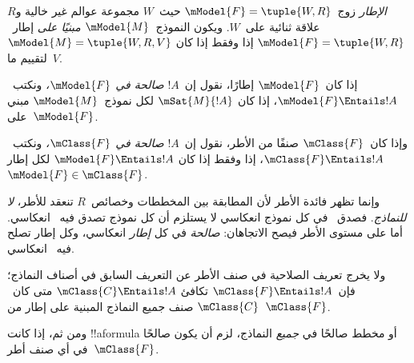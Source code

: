 \documentclass[../../../include/open-logic-section]{subfiles}
\begin{document}


\begin{defn}
  \emph{الإطار} زوج~$\mModel{F} = \tuple{W,R}$ حيث~$W$ مجموعة عوالم
  غير خالية و$R$ علاقة ثنائية على~$W$. ويكون النموذج~$\mModel{M}$
  \emph{مبنيًا على} إطار~$\mModel{F} = \tuple{W,R}$ إذا وفقط إذا كان
  $\mModel{M} = \tuple{W, R, V}$ لتقييم ما~$V$.
\end{defn}

\begin{defn}
  إذا كان~$\mModel{F}$ إطارًا، نقول إن~$!A$ \emph{صالحة في
    $\mModel{F}$،} ونكتب~$\mModel{F} \Entails !A$، إذا كان
  $\mSat{M}{!A}$ لكل نموذج~$\mModel{M}$ مبني على~$\mModel{F}$.

  وإذا كان~$\mClass{F}$ صنفًا من الأطر، نقول إن~$!A$ \emph{صالحة في
    $\mClass{F}$،} ونكتب~$\mClass{F} \Entails !A$، إذا وفقط إذا كان
  $\mModel{F} \Entails !A$ لكل إطار~$\mModel{F} \in \mClass{F}$.
\end{defn}

وإنما تظهر فائدة الأطر لأن المطابقة بين المخططات وخصائص~$R$
تنعقد للأطر، \emph{لا للنماذج}. فصدق~ في كل نموذج انعكاسي
لا يستلزم أن كل نموذج تصدق فيه~ انعكاسي.
أما على مستوى الأطر فيصح الاتجاهان:  \emph{صالحة} في كل
\emph{إطار} انعكاسي، وكل إطار تصلح فيه~ انعكاسي.

\begin{rem}
ولا يخرج تعريف الصلاحية في صنف الأطر عن التعريف السابق في أصناف
النماذج؛ فإن~$\mClass{F} \Entails !A$ تكافئ
$\mClass{C} \Entails !A$ متى كان~$\mClass{C}$ صنف جميع النماذج
المبنية على إطار من~$\mClass{F}$.

ومن ثم، إذا كانت !!a{formula} أو مخطط صالحًا في \emph{جميع}
النماذج، لزم أن يكون صالحًا في أي صنف أطر~$\mClass{F}$.
\end{rem}
\end{document}

